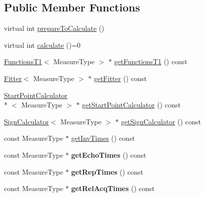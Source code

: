 \subsection*{Public Member Functions}
\begin{DoxyCompactItemize}
\item 
virtual int \hyperlink{class_ox_1_1_calculator_t1_af8b7d97caa1f197c937942c8ebc5ae7b}{prepare\-To\-Calculate} ()
\item 
virtual int \hyperlink{class_ox_1_1_calculator_t1_ab8d5ec3f03e070ca11d3accb59a92299}{calculate} ()=0
\item 
\hyperlink{class_ox_1_1_functions_t1}{Functions\-T1}$<$ Measure\-Type $>$ $\ast$ \hyperlink{class_ox_1_1_calculator_t1_a34cee88c8f78b6486ebbfc910559717b}{get\-Functions\-T1} () const 
\item 
\hyperlink{class_ox_1_1_fitter}{Fitter}$<$ Measure\-Type $>$ $\ast$ \hyperlink{class_ox_1_1_calculator_t1_a57f0218fb065b685f4ed5f80051517bd}{get\-Fitter} () const 
\item 
\hyperlink{class_ox_1_1_start_point_calculator}{Start\-Point\-Calculator}\\*
$<$ Measure\-Type $>$ $\ast$ \hyperlink{class_ox_1_1_calculator_t1_a2ee52aac70f34defc99373d5f9f1ed8a}{get\-Start\-Point\-Calculator} () const 
\item 
\hyperlink{class_ox_1_1_sign_calculator}{Sign\-Calculator}$<$ Measure\-Type $>$ $\ast$ \hyperlink{class_ox_1_1_calculator_t1_affc80bde70a6f44f2474e9e0606ba3e0}{get\-Sign\-Calculator} () const 
\item 
const Measure\-Type $\ast$ \hyperlink{class_ox_1_1_calculator_t1_a7179ab384f0ff7f9bf28dc492672da00}{get\-Inv\-Times} () const 
\item 
\hypertarget{class_ox_1_1_calculator_t1_ae892db0c62023dcafbfe6cc2d7877919}{const Measure\-Type $\ast$ {\bfseries get\-Echo\-Times} () const }\label{class_ox_1_1_calculator_t1_ae892db0c62023dcafbfe6cc2d7877919}

\item 
\hypertarget{class_ox_1_1_calculator_t1_aaa68c32a3bba3f994cf00f5c41551952}{const Measure\-Type $\ast$ {\bfseries get\-Rep\-Times} () const }\label{class_ox_1_1_calculator_t1_aaa68c32a3bba3f994cf00f5c41551952}

\item 
\hypertarget{class_ox_1_1_calculator_t1_ac75dbb9b03f6350c19c1551c2bd4bf47}{const Measure\-Type $\ast$ {\bfseries get\-Rel\-Acq\-Times} () const }\label{class_ox_1_1_calculator_t1_ac75dbb9b03f6350c19c1551c2bd4bf47}


\end{DoxyCompactItemize}
